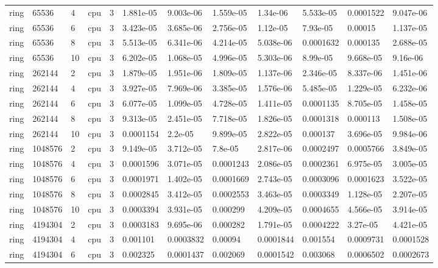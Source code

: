 \begin{tabular}{llllllllllll}
ring & 65536 & 4 & cpu & 3 & 1.881e-05 & 9.003e-06 & 1.559e-05 & 1.34e-06 & 5.533e-05 & 0.0001522 & 9.047e-06 \\
ring & 65536 & 6 & cpu & 3 & 3.423e-05 & 3.685e-06 & 2.756e-05 & 1.12e-05 & 7.93e-05 & 0.00015 & 1.137e-05 \\
ring & 65536 & 8 & cpu & 3 & 5.513e-05 & 6.341e-06 & 4.214e-05 & 5.038e-06 & 0.0001632 & 0.000135 & 2.688e-05 \\
ring & 65536 & 10 & cpu & 3 & 6.202e-05 & 1.068e-05 & 4.996e-05 & 5.303e-06 & 8.99e-05 & 9.668e-05 & 9.16e-06 \\
ring & 262144 & 2 & cpu & 3 & 1.879e-05 & 1.951e-06 & 1.809e-05 & 1.137e-06 & 2.346e-05 & 8.337e-06 & 1.451e-06 \\
ring & 262144 & 4 & cpu & 3 & 3.927e-05 & 7.969e-06 & 3.385e-05 & 1.576e-06 & 5.485e-05 & 1.229e-05 & 6.232e-06 \\
ring & 262144 & 6 & cpu & 3 & 6.077e-05 & 1.099e-05 & 4.728e-05 & 1.411e-05 & 0.0001135 & 8.705e-05 & 1.458e-05 \\
ring & 262144 & 8 & cpu & 3 & 9.313e-05 & 2.451e-05 & 7.718e-05 & 1.826e-05 & 0.0001318 & 0.000113 & 1.508e-05 \\
ring & 262144 & 10 & cpu & 3 & 0.0001154 & 2.2e-05 & 9.899e-05 & 2.822e-05 & 0.000137 & 3.696e-05 & 9.984e-06 \\
ring & 1048576 & 2 & cpu & 3 & 9.149e-05 & 3.712e-05 & 7.8e-05 & 2.817e-06 & 0.0002497 & 0.0005766 & 3.849e-05 \\
ring & 1048576 & 4 & cpu & 3 & 0.0001596 & 3.071e-05 & 0.0001243 & 2.086e-05 & 0.0002361 & 6.975e-05 & 3.005e-05 \\
ring & 1048576 & 6 & cpu & 3 & 0.0001971 & 1.402e-05 & 0.0001669 & 2.743e-05 & 0.0003096 & 0.0001623 & 3.522e-05 \\
ring & 1048576 & 8 & cpu & 3 & 0.0002845 & 3.412e-05 & 0.0002553 & 3.463e-05 & 0.0003349 & 1.128e-05 & 2.207e-05 \\
ring & 1048576 & 10 & cpu & 3 & 0.0003394 & 3.931e-05 & 0.000299 & 4.209e-05 & 0.0004655 & 4.566e-05 & 3.914e-05 \\
ring & 4194304 & 2 & cpu & 3 & 0.0003183 & 9.695e-06 & 0.000282 & 1.791e-05 & 0.0004222 & 3.27e-05 & 4.421e-05 \\
ring & 4194304 & 4 & cpu & 3 & 0.001101 & 0.0003832 & 0.00094 & 0.0001844 & 0.001554 & 0.0009731 & 0.0001528 \\
ring & 4194304 & 6 & cpu & 3 & 0.002325 & 0.0001437 & 0.002069 & 0.0001542 & 0.003068 & 0.0006502 & 0.0002673 \\

\end{tabular}
